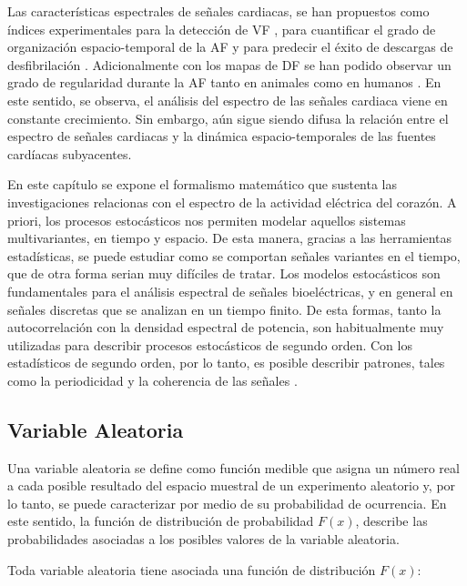 Las características espectrales de señales cardiacas, se han propuestos como índices experimentales para la detección de \ac{VF} \cite{Barro89}, para cuantificar el grado de organización espacio-temporal de la \ac{AF} \cite{Everett01a} y para predecir el éxito de descargas de desfibrilación \cite{Strohmenger97, Eftestol00, Jekova04}.
Adicionalmente con los mapas de \ac{DF} se han podido observar un grado de regularidad durante la \ac{AF} tanto en animales \cite{Skanes98, Mandapati00, Mansour01} como en humanos \cite{Sanders05, Atienza06}. En este sentido, se observa, el análisis del espectro de las señales cardiaca viene en constante crecimiento. Sin embargo, aún sigue siendo difusa la relación entre el espectro de señales cardiacas y la dinámica espacio-temporales de las fuentes cardíacas subyacentes.


En este capítulo se expone el formalismo matemático que sustenta las investigaciones relacionas con el espectro de la actividad eléctrica del corazón. A priori, los procesos estocásticos nos permiten modelar aquellos sistemas multivariantes, en tiempo y espacio. De esta manera, gracias a las herramientas estadísticas, se puede estudiar como se comportan señales variantes en el tiempo, que de otra forma serian muy difíciles de tratar. Los modelos estocásticos son fundamentales para el análisis espectral de señales bioeléctricas, y en general en señales discretas que se analizan en un tiempo finito. De esta formas, tanto la autocorrelación con la densidad espectral de potencia, son habitualmente muy utilizadas para describir procesos estocásticos de segundo orden. Con los estadísticos de segundo orden, por lo tanto, es posible describir patrones, tales como la periodicidad y la coherencia de las señales \cite{Requena08}. 



\subsection{Variable Aleatoria}\label{subs:varaleatoria}

Una variable aleatoria se define como función medible que asigna un número real a cada posible resultado del espacio muestral de un experimento aleatorio y, por lo tanto, se puede caracterizar por medio de su probabilidad de ocurrencia. En este sentido, la función de distribución de probabilidad ${F(x)}$, describe las probabilidades asociadas a los posibles valores de la variable aleatoria.

Toda variable aleatoria tiene asociada una función de distribución ${F(x)}$:

